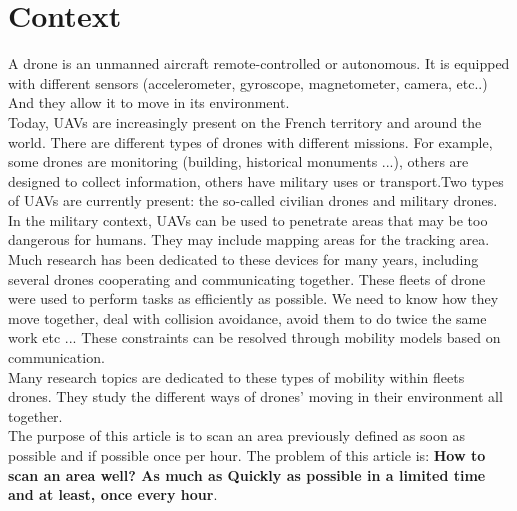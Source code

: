 \chapter{Context}

A drone is an unmanned aircraft remote-controlled or autonomous. It is equipped with different sensors (accelerometer, gyroscope, magnetometer, camera, etc..) And they allow it to move in its environment.\\

Today, UAVs are increasingly present on the French territory and around the world. There are different types of drones with different missions. For example, some drones are monitoring (building, historical monuments ...), others are designed to collect information, others have military uses or transport.Two types of UAVs are currently present: the so-called civilian drones and military drones. In the military context, UAVs can be used to penetrate areas that may be too dangerous for humans. They may include mapping areas for the tracking area.\\

Much research has been dedicated to these devices for many years, including several drones cooperating and communicating together. These fleets of drone were used to perform tasks as efficiently as possible. We need to know how they move together, deal with collision avoidance, avoid them to do twice the same work etc ... These constraints can be resolved through mobility models based on communication.\\
Many research topics are dedicated to these types of mobility within fleets drones. They study the different ways of drones' moving in their environment all together.\\

The purpose of this article is to scan an area previously defined as soon as possible and if possible once per hour. The problem of this article is:
\textbf{How to scan an area well? As much as Quickly as possible in a limited time and at least, once every hour}.